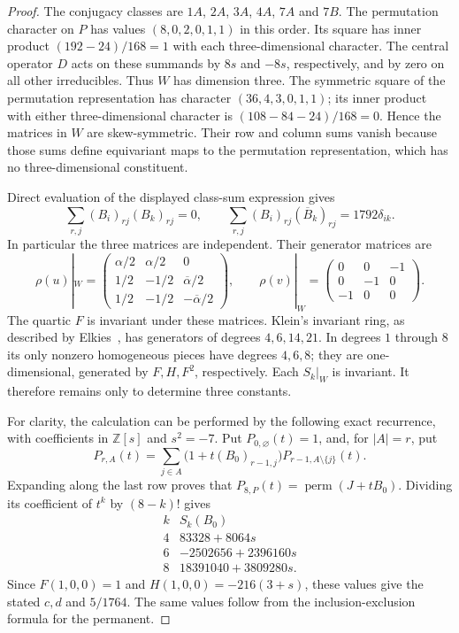 \begin{proof}
The conjugacy classes are $1A$, $2A$, $3A$, $4A$, $7A$ and $7B$.
The permutation character on $P$ has values $(8,0,2,0,1,1)$ in this order. Its square has inner product
$(192-24)/168=1$ with each three-dimensional character. The central operator
$D$ acts on these summands by $8s$ and $-8s$, respectively, and by zero on all other irreducibles. Thus $W$ has dimension three. The symmetric square of the permutation representation has character $(36,4,3,0,1,1)$; its inner product with either three-dimensional character is
$(108-84-24)/168=0$. Hence the matrices in $W$ are skew-symmetric. Their row and column sums vanish because those sums define equivariant maps to the permutation representation, which has no three-dimensional constituent.

Direct evaluation of the displayed class-sum expression gives
\[
 \sum_{r,j}(B_i)_{rj}(B_k)_{rj}=0,
 \qquad
 \sum_{r,j}(B_i)_{rj}(\overline B_k)_{rj}=1792\delta_{ik}.
\]
In particular the three matrices are independent. Their generator matrices are
\[
 \rho(u)|_W=
 \begin{pmatrix}
 \alpha/2&\alpha/2&0\\
 1/2&-1/2&\overline\alpha/2\\
 1/2&-1/2&-\overline\alpha/2
 \end{pmatrix},\qquad
 \rho(v)|_W=
 \begin{pmatrix}0&0&-1\\0&-1&0\\-1&0&0\end{pmatrix}.
\]
The quartic $F$ is invariant under these matrices. Klein's invariant ring,
as described by Elkies~\cite[\S1.2, pp.~55--58, (1.9)--(1.18)]{Elkies1999},
has generators of degrees $4,6,14,21$. In degrees $1$ through $8$ its only nonzero homogeneous pieces have degrees $4,6,8$; they are one-dimensional, generated by $F,H,F^2$, respectively. Each $S_k|_W$ is invariant. It therefore remains only to determine three constants.

For clarity, the calculation can be performed by the following exact recurrence, with coefficients in $\mathbb Z[s]$ and $s^2=-7$. Put
$P_{0,\varnothing}(t)=1$, and, for $|A|=r$, put
\[
 P_{r,A}(t)=\sum_{j\in A}
       \bigl(1+t(B_0)_{r-1,j}\bigr)P_{r-1,A\setminus\{j\}}(t).
\]
Expanding along the last row proves that
$P_{8,P}(t)=\operatorname{perm}(J+tB_0)$. Dividing its coefficient of $t^k$ by $(8-k)!$ gives
\[
\begin{array}{c|l}
 k&S_k(B_0)\\\hline
 4&83328+8064s\\
 6&-2502656+2396160s\\
 8&18391040+3809280s.
\end{array}
\]
Since $F(1,0,0)=1$ and $H(1,0,0)=-216(3+s)$, these values give the stated $c,d$ and $5/1764$. The same values follow from the inclusion-exclusion formula for the permanent.


\end{proof}
